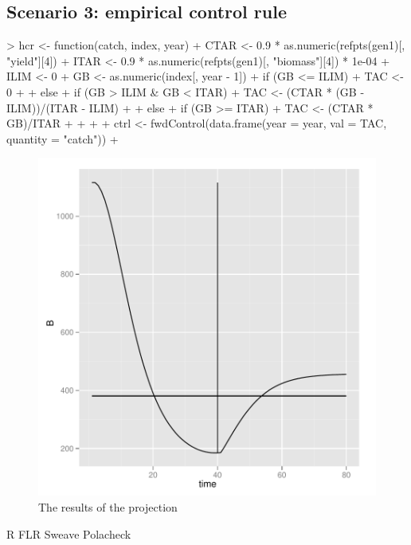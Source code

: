 \documentclass[a4paper]{article}
\begin{document}
\subsection{Scenario 3: empirical control rule}
\begin{Schunk}
\begin{Sinput}
> hcr <- function(catch, index, year) {
+     CTAR <- 0.9 * as.numeric(refpts(gen1)[, "yield"][4])
+     ITAR <- 0.9 * as.numeric(refpts(gen1)[, "biomass"][4]) * 1e-04
+     ILIM <- 0
+     GB <- as.numeric(index[, year - 1])
+     if (GB <= ILIM) {
+         TAC <- 0
+     }
+     else {
+         if (GB > ILIM & GB < ITAR) {
+             TAC <- (CTAR * (GB - ILIM))/(ITAR - ILIM)
+         }
+         else {
+             if (GB >= ITAR) {
+                 TAC <- (CTAR * GB)/ITAR
+             }
+         }
+     }
+     ctrl <- fwdControl(data.frame(year = year, val = TAC, quantity = "catch"))
+ }
\end{Sinput}
\end{Schunk}

\begin{figure}
\includegraphics{script-hcr_plot_sc3}
\caption{The results of the projection}
\label{fig:hcr_proj_biomass}
\end{figure}



\newpage


R
FLR
Sweave
Polacheck
\end{document}
